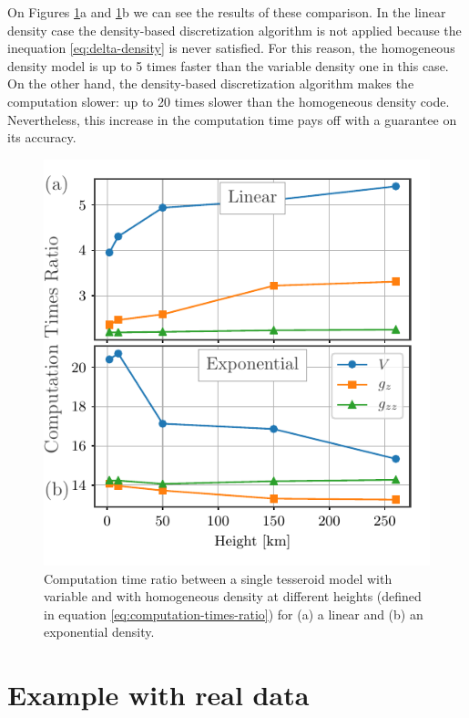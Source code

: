 \documentclass[extra]{gji}
\begin{document}
On Figures \ref{fig:speed-comparison}a and \ref{fig:speed-comparison}b we can see the results of these comparison.
In the linear density case the density-based discretization algorithm is not applied because the inequation \ref{eq:delta-density} is never satisfied.
For this reason, the homogeneous density model is up to 5 times faster than the variable density one in this case.
On the other hand, the density-based discretization algorithm makes the computation slower: up to 20 times slower than the homogeneous density code.
Nevertheless, this increase in the computation time pays off with a guarantee on its accuracy.

\begin{figure}
\centering
\includegraphics[width=0.9\linewidth]{figures/speed-comparison.pdf}
\caption{Computation time ratio between a single tesseroid model with variable and with homogeneous density at different heights (defined in equation \ref{eq:computation-times-ratio}) for (a) a linear and (b) an exponential density.}
\label{fig:speed-comparison}
\end{figure}



\section{Example with real data}
\end{document}
